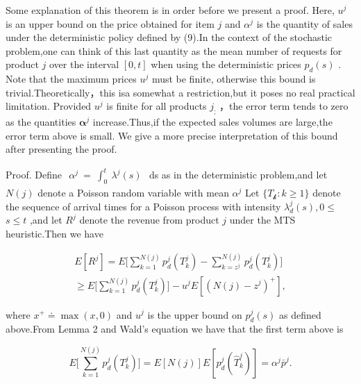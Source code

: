 Some explanation of this theorem is in order before we present a proof.
Here, \(u ^ { j }\) is an upper bound on the price obtained for item
\(j\) and \(\alpha ^ { j }\) is the quantity of sales under the
deterministic policy defined by (9).In the context of the stochastic
problem,one can think of this last quantity as the mean number of
requests for product \(j\) over the interval \([ 0 , t ]\) when using
the deterministic prices \(p _ { d } ( s )\) . Note that the maximum
prices \(u ^ { j }\) must be finite, otherwise this bound is
trivial.Theoretically，this isa somewhat a restriction,but it poses no
real practical limitation. Provided \(u ^ { j }\) is finite for all
products \(j _ { ; }\) ，the error term tends to zero as the quantities
\(\boldsymbol { \alpha } ^ { j }\) increase.Thus,if the expected sales
volumes are large,the error term above is small. We give a more precise
interpretation of this bound after presenting the proof.

Proof. Define
\(\begin{array} { r } { \alpha ^ { j } ~ = ~ \int _ { 0 } ^ { t } ~ \lambda ^ { j } ( s ) } \end{array}\)
ds as in the deterministic problem,and let \(N ( j )\) denote a Poisson
random variable with mean \(\alpha ^ { j }\) Let
\(\{ T _ { \mathcal { k } } \colon k \geqslant 1 \}\) denote the
sequence of arrival times for a Poisson process with intensity
\(\lambda _ { d } ^ { j } ( s ) , 0 \leqslant\) \(s \leqslant t\) ,and
let \(R ^ { j }\) denote the revenue from product \(j\) under the MTS
heuristic.Then we have

\[
\begin{array} { l } { { \displaystyle E [ R ^ { j } ] = E \biggl [ \sum _ { k = 1 } ^ { N ( j ) } p _ { d } ^ { j } ( T _ { k } ^ { j } ) - \sum _ { k = z ^ { j } } ^ { N ( j ) } p _ { d } ^ { j } ( T _ { k } ^ { j } ) \biggr ] } } \\ { { \displaystyle \geqslant E \biggl [ \sum _ { k = 1 } ^ { N ( j ) } p _ { d } ^ { j } ( T _ { k } ^ { j } ) \biggr ] - u ^ { j } E [ ( N ( j ) - z ^ { j } ) ^ { + } ] , } } \end{array}
\]

where \(x ^ { + } \doteq \operatorname* { m a x } ( x , 0 )\) and
\(u ^ { j }\) is the upper bound on \(p _ { d } ^ { j } ( s )\) as
defined above.From Lemma 2 and Wald's equation we have that the first
term above is

\[
E \Big [ \sum _ { k = 1 } ^ { N ( j ) } p _ { d } ^ { j } ( T _ { k } ^ { j } ) \Big ] = E [ N ( j ) ] E [ p _ { d } ^ { j } ( \hat { T } _ { k } ^ { j } ) ] = \alpha ^ { j } \bar { p } ^ { j } .
\]

